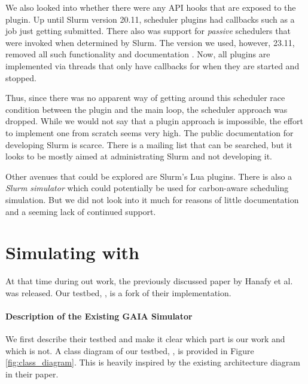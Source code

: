 We also looked into whether there were any API hooks that are exposed to the plugin. 
Up until Slurm version 20.11, scheduler plugins had callbacks  such as a job just getting submitted. 
There also was support for \emph{passive} schedulers that were invoked when determined by Slurm.
The version we used, however,  23.11, removed all such functionality and documentation .  
Now, all plugins are implemented via threads that only have callbacks for when they are started and stopped.

Thus, since there was no apparent way of getting around this scheduler race condition between the plugin and the main loop, the scheduler approach was dropped. 
While we would not say that a plugin approach is impossible, the effort to implement one from scratch seems very high. 
The public documentation for developing Slurm is scarce. 
There is a mailing list that can be searched, but it looks to be mostly aimed at administrating Slurm and not developing it.

Other avenues that could be explored are Slurm's Lua plugins. 
There is also a \emph{Slurm simulator}  which could potentially be used for carbon-aware scheduling simulation.
But we did not look into it much for reasons of little documentation and a seeming lack of continued support.

\section{Simulating with \programname{}}

At that time during out work, the previously discussed paper by Hanafy et al. \cite{hanafy_going_2024} was released. 
Our testbed, \emph{\programname{}}, is a fork of their implementation.

\paragraph{Description of the Existing GAIA Simulator}

We first describe their testbed and make it clear which part is our work and which is not. A class diagram of our testbed, \programname{}, is provided in Figure \ref{fig:class_diagram}. 
This is heavily inspired by the existing architecture diagram in their paper. 

